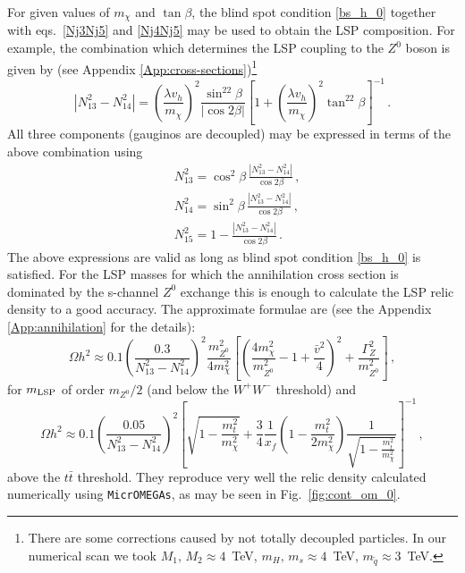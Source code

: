 \documentclass[12pt,twoside]{article}
\begin{document}
For given values of $m_\chi$ and $\tan\beta$, the blind spot condition 
\eqref{bs_h_0} together with eqs.~\eqref{Nj3Nj5} and \eqref{Nj4Nj5} 
may be used to obtain the LSP composition. 
For example, the combination 
which determines the LSP coupling to the $Z^0$ boson is given 
by (see Appendix \ref{App:cross-sections})\footnote{
There are some corrections caused by not totally decoupled particles. 
In our numerical scan we took $M_1,\,M_2\approx 4$~TeV, 
$m_H,\,m_s\approx 4$~TeV, $m_{\tilde{q}}\approx 3$~TeV.}
%
%
\begin{equation}
\label{N13sqmN14sq_0}
\left|N_{13}^2-N_{14}^2\right|=\left(\frac{\lambda v_h}{m_\chi}\right)^2
\frac{\sin^22\beta}{|\cos2\beta|}
\left[1+\left(\frac{\lambda v_h}{m_\chi}\right)^2\tan^22\beta\right]^{-1}\,.
\end{equation}
%
%
All three components (gauginos are decoupled) may be expressed in terms
of the above combination using
%
%
\begin{align}
&N_{13}^2=\cos^2\beta\,\frac{\left|N_{13}^2-N_{14}^2\right|}{\cos2\beta}
\,,\label{N13_0}
\\
&N_{14}^2=\sin^2\beta\,\frac{\left|N_{13}^2-N_{14}^2\right|}{\cos2\beta}
\,,\label{N14_0}
\\
&N_{15}^2=1-\frac{\left|N_{13}^2-N_{14}^2\right|}{\cos2\beta}
\,.\label{N15_0}
\end{align}
%
%
The above expressions are valid as long as blind spot condition 
\eqref{bs_h_0} is satisfied. 
For the LSP masses for which the annihilation cross section is 
dominated by the s-channel $Z^0$ exchange this is enough to calculate 
the LSP relic density to a good accuracy. The approximate formulae are
(see the Appendix \ref{App:annihilation} for the details): 
%
%
\begin{equation}
\label{eq:res_Z_omega}
\Omega h^2\approx 0.1\left(\frac{0.3}{N_{13}^2-N_{14}^2}\right)^2
\frac{m_{Z^0}^2}{4m_{\chi}^2}
\left[\left(\frac{4m_{\chi}^2}{m_{Z^0}^2}-1 +\frac{\bar{v}^2}{4}\right)^2+
\frac{\Gamma_Z^2}{m_{Z^0}^2}\right]\,,
\end{equation}
%
%
for $m_{\rm LSP}$ of order $m_{Z^0}/2$ (and below the $W^+W^-$ threshold)
and
%
%
\begin{equation}
\label{eq:ann_tt_omega}
\Omega h^2\approx 0.1\left(\frac{0.05}{N_{13}^2-N_{14}^2}\right)^2
\left[
\sqrt{1-\frac{m_t^2}{m_{\chi}^2}}+
\frac{3}{4}\frac{1}{x_f}
\left(1-\frac{m_t^2}{2m_{\chi}^2}\right)
\frac{1}{\sqrt{1-\frac{m_t^2}{m_{\chi}^2}}}
\right]^{-1}\,,
\end{equation}
%
%
above the $t\bar{t}$ threshold. They reproduce very well the relic density 
calculated numerically using \texttt{MicrOMEGAs}, as may be seen in 
Fig.~\ref{fig:cont_om_0}.
\end{document}
